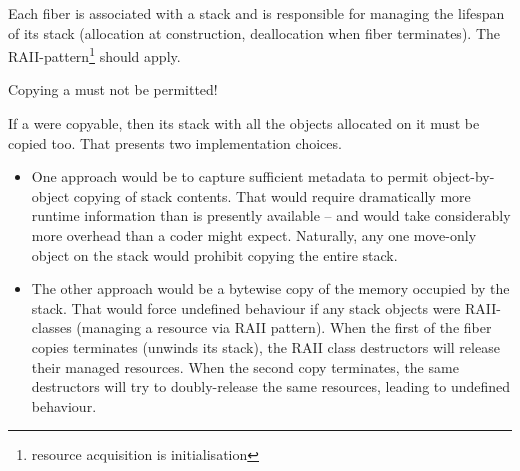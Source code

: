 \label{stackmgmt}

Each fiber is associated with a stack and is responsible for managing the lifespan
of its stack (allocation at construction, deallocation when fiber terminates). The
RAII-pattern\footnote{resource acquisition is initialisation} should apply.

Copying a \fiber must not be permitted!

If a \fiber were copyable, then its stack with all the objects allocated on it
must be copied too. That presents two implementation choices.
\begin{itemize}
    \item One approach would be to capture sufficient metadata to permit
          object-by-object copying of stack contents. That would require
          dramatically more runtime information than is presently available --
          and would take considerably more overhead than a coder might expect.
          Naturally, any one move-only object on the stack would prohibit
          copying the entire stack.
    \item The other approach would be a bytewise copy of the memory occupied
          by the stack. That would force undefined behaviour if any stack
          objects were RAII-classes (managing a resource via RAII pattern). When the first
          of the fiber copies terminates (unwinds its stack), the RAII class destructors
          will release their managed resources. When the second copy terminates, the same
          destructors will try to doubly-release the same resources, leading to undefined
          behaviour.
\end{itemize}

